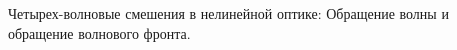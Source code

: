 
\begin{leftrules}
Четырех-волновые смешения в нелинейной оптике: Обращение волны и обращение волнового фронта.
\end{leftrules}